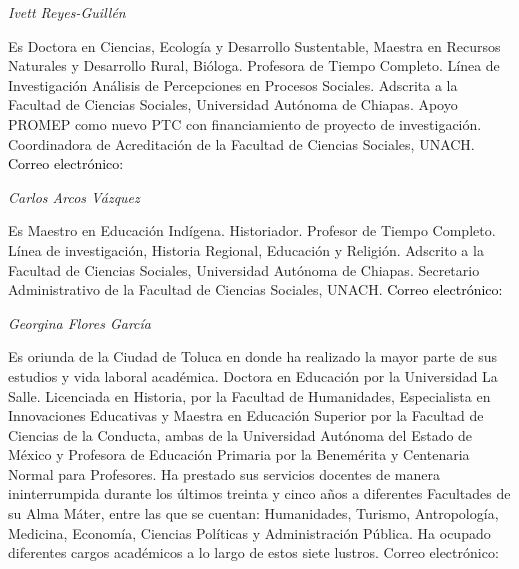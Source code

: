 \bigskip


\bigskip

{ 
\textit{Ivett Reyes-Guillén}}

{ 
Es Doctora en Ciencias, Ecología y Desarrollo Sustentable, Maestra en
Recursos Naturales y Desarrollo Rural, Bióloga. Profesora de Tiempo
Completo. Línea de Investigación Análisis de Percepciones en Procesos
Sociales. Adscrita a la Facultad de Ciencias Sociales, Universidad Autónoma
de Chiapas. Apoyo PROMEP como nuevo PTC con financiamiento de proyecto de
investigación. Coordinadora de Acreditación de la Facultad de Ciencias
Sociales, UNACH. \textcolor{black}{Correo electrónico:
}\href{mailto:ivettrg2@hotmail.com}{}\textstyleInternetLink{
}}


\bigskip

{ 
\textit{Carlos Arcos Vázquez}}

{ 
Es Maestro en Educación Indígena. Historiador. Profesor de Tiempo Completo.
Línea de investigación, Historia Regional, Educación y Religión. Adscrito a
la Facultad de Ciencias Sociales, Universidad Autónoma de Chiapas.
Secretario Administrativo de la Facultad de Ciencias Sociales, UNACH.
\textcolor{black}{Correo electrónico:}
\href{mailto:karkos2005@hotmail.com}{}\textstyleInternetLink{
}\textstyleInternetLink{\textcolor[rgb]{0.0,0.0,0.039215688}{y
}}\href{mailto:carcos@unach.mx}{}\textstyleInternetLink{
}}


\bigskip


\bigskip

{ 
\textit{Georgina Flores García}}

{ 
Es oriunda de la Ciudad de Toluca en donde ha realizado la mayor parte de
sus estudios y vida laboral académica. Doctora en Educación por la
Universidad La Salle. Licenciada en Historia,  por la Facultad de
Humanidades, Especialista en Innovaciones Educativas y Maestra en Educación
Superior por la Facultad de Ciencias de la Conducta, ambas de la
Universidad Autónoma del Estado de México y Profesora de Educación Primaria
por la Benemérita y Centenaria Normal para Profesores.  Ha prestado sus
servicios docentes de manera ininterrumpida durante los últimos treinta y
cinco años a diferentes Facultades de su Alma Máter, entre las que se
cuentan: Humanidades, Turismo, Antropología, Medicina, Economía, Ciencias
Políticas y Administración Pública. Ha ocupado diferentes cargos académicos
a lo largo de estos siete lustros. Correo electrónico: 
\href{mailto:ginaflores5601@yahoo.com.mx}{\textstyleInternetlink{\textcolor{blue}{ginaflores5601@yahoo.com.mx}}}}



